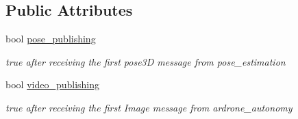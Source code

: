 \subsection*{Public Attributes}
\begin{DoxyCompactItemize}
\item 
\mbox{\label{classImageProcessor_ad10f9df9c9717fd360537841b210585c}} 
bool \hyperlink{classImageProcessor_ad10f9df9c9717fd360537841b210585c}{pose\+\_\+publishing}
\begin{DoxyCompactList}\small\item\em true after receiving the first pose3D message from pose\+\_\+estimation \end{DoxyCompactList}\item 
\mbox{\label{classImageProcessor_a9b53107e1aa08d862e40d9ec27400d8f}} 
bool \hyperlink{classImageProcessor_a9b53107e1aa08d862e40d9ec27400d8f}{video\+\_\+publishing}
\begin{DoxyCompactList}\small\item\em true after receiving the first Image message from ardrone\+\_\+autonomy \end{DoxyCompactList}\end{DoxyCompactItemize}
